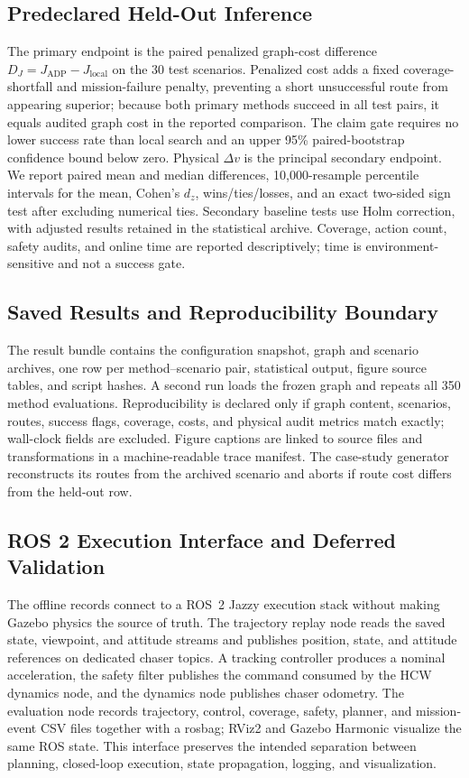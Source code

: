 \documentclass{IEEEtaes}
\theoremstyle{remark}
\theoremstyle{plain}
\begin{document}
\subsection{Predeclared Held-Out Inference}

The primary endpoint is the paired penalized graph-cost difference $D_J=J_{\mathrm{ADP}}-J_{\mathrm{local}}$ on the 30 test scenarios. Penalized cost adds a fixed coverage-shortfall and mission-failure penalty, preventing a short unsuccessful route from appearing superior; because both primary methods succeed in all test pairs, it equals audited graph cost in the reported comparison. The claim gate requires no lower success rate than local search and an upper 95\% paired-bootstrap confidence bound below zero. Physical $\Delta v$ is the principal secondary endpoint. We report paired mean and median differences, 10,000-resample percentile intervals for the mean, Cohen's $d_z$, wins/ties/losses, and an exact two-sided sign test after excluding numerical ties. Secondary baseline tests use Holm correction, with adjusted results retained in the statistical archive. Coverage, action count, safety audits, and online time are reported descriptively; time is environment-sensitive and not a success gate.

\subsection{Saved Results and Reproducibility Boundary}

The result bundle contains the configuration snapshot, graph and scenario archives, one row per method--scenario pair, statistical output, figure source tables, and script hashes. A second run loads the frozen graph and repeats all 350 method evaluations. Reproducibility is declared only if graph content, scenarios, routes, success flags, coverage, costs, and physical audit metrics match exactly; wall-clock fields are excluded. Figure captions are linked to source files and transformations in a machine-readable trace manifest. The case-study generator reconstructs its routes from the archived scenario and aborts if route cost differs from the held-out row.

\subsection{ROS 2 Execution Interface and Deferred Validation}

The offline records connect to a ROS~2 Jazzy execution stack without making Gazebo physics the source of truth. The trajectory replay node reads the saved state, viewpoint, and attitude streams and publishes position, state, and attitude references on dedicated chaser topics. A tracking controller produces a nominal acceleration, the safety filter publishes the command consumed by the HCW dynamics node, and the dynamics node publishes chaser odometry. The evaluation node records trajectory, control, coverage, safety, planner, and mission-event CSV files together with a rosbag; RViz2 and Gazebo Harmonic visualize the same ROS state. This interface preserves the intended separation between planning, closed-loop execution, state propagation, logging, and visualization.
\end{document}
